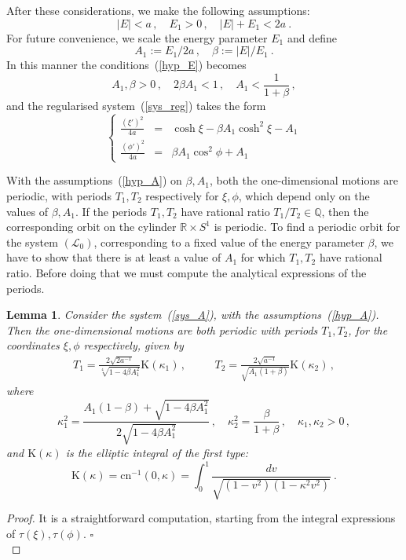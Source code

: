 \documentclass[a4paper]{article}
\newtheorem{lemma}{Lemma}
\begin{document}
After these considerations, we make the following assumptions:
\begin{equation}
  \label{hyp_E}
  |E|<a\,, \quad E_1>0\,, \quad |E|+E_1<2a\ .
\end{equation} 
For future convenience, we scale the energy parameter $E_1$ and define
\[
A_1:=E_1/2a\,, \quad  \beta:= |E|/E_1 \ .
\]
In this manner the conditions~(\ref{hyp_E}) becomes
\begin{equation}
  \label{hyp_A}
  A_1,\beta>0\,, \quad 2\beta A_1 < 1\,, \quad A_1<\frac{1}{1+\beta}\,,
\end{equation}
and the regularised system~(\ref{sys_reg}) takes the form
\begin{equation}
  \label{sys_A}
  \left\{
  \begin{array}{rcl}
    \frac{(\xi')^2  }{4a}&=& 
    \cosh \xi  - \beta A_1\cosh^2 \xi   
    - A_1
    \\
    \frac{ (\phi')^2}{4a} 
    &=&  \beta A_1 \cos^2\phi +A_1 
  \end{array}
  \right.
\end{equation}

With the assumptions~(\ref{hyp_A}) on $\beta,A_1$, both the
one-dimensional motions are periodic, with periods $T_1,T_2$
respectively for $\xi,\phi$, which depend only on the values of
$\beta,A_1$. If the periods $T_1,T_2$ have rational ratio $T_1/T_2 \in
{\mathbb{Q}}$, then the corresponding orbit on the cylinder ${\mathbb{R}}\times S^1$ is
periodic. To find a periodic orbit for the system $(\mathcal{L}_0)$,
corresponding to a fixed value of the energy parameter $\beta$, we
have to show that there is at least a value of $A_1$ for which
$T_1,T_2$ have rational ratio.  Before doing that we must compute the
analytical expressions of the periods.
\begin{lemma}
\label{periods}
Consider the system~(\ref{sys_A}), with the
assumptions~(\ref{hyp_A}). Then the one-dimensional motions are both
periodic with periods $T_1,T_2$, for the coordinates $\xi,\phi$
respectively, given by
\begin{eqnarray}
    T_1=\frac{2\sqrt{2a^{-1}}}{\sqrt[4]{1-4\beta A_1^2}}{\mathrm{K}}(\kappa_1)
    \,, &\quad&
    T_2=\frac{2\sqrt{a^{-1}}}{\sqrt{A_1(1+\beta)}}{\mathrm{K}}(\kappa_2) \,,
\end{eqnarray}
where
\[
\kappa_1^2=\frac{A_1(1-\beta)+\sqrt{1-4\beta A_1^2}}{2\sqrt{1-4\beta
    A_1^2}} \,, \quad \kappa_2^2=\frac{\beta}{1+\beta} \,, \quad
\kappa_1,\kappa_2 > 0 \,,
\] 
and ${\mathrm{K}}(\kappa)$ is the elliptic integral of the first type:
\[
{\mathrm{K}}(\kappa)={\mathrm{cn}}^{-1}(0,\kappa)=\int_0^1\frac{dv}{\sqrt{(1-v^2)(1-\kappa^2v^2)}}
\ .
\]
\end{lemma}
\begin{proof} 
It is a straightforward computation, starting from the integral
expressions of $\tau(\xi),\tau(\phi)$. 
{$\square$\\}
\end{proof}
\end{document}
